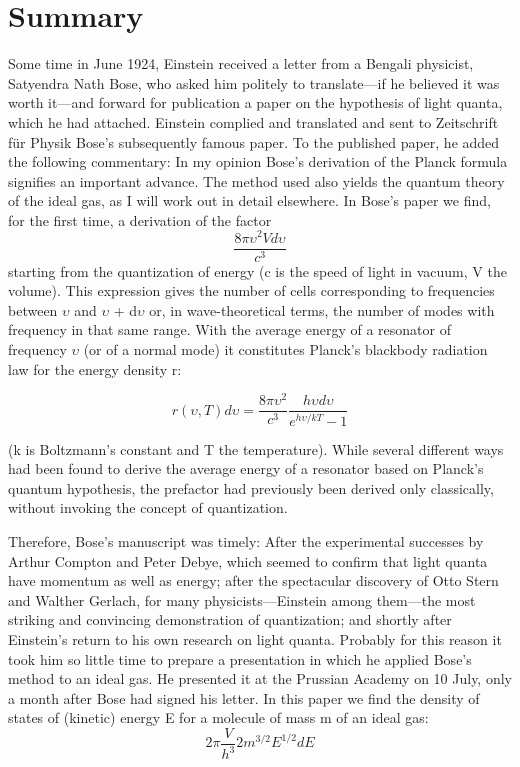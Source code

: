 \documentclass[12pt, letterpaper]{article}
\begin{document}
    \section*{Summary}

    Some time in June 1924, Einstein received a letter from a Bengali physicist,
    Satyendra Nath Bose, who asked him politely to translate—if he believed it
    was worth it—and forward for publication a paper on the hypothesis of light
    quanta, which he had attached. Einstein complied and translated and sent
    to Zeitschrift für Physik Bose’s subsequently famous paper. To the published
    paper, he added the following commentary:
    In my opinion Bose’s derivation of the Planck formula signifies an
    important advance. The method used also yields the quantum theory of the ideal gas, as I will work out in detail elsewhere.
    In Bose’s paper we find, for the first time, a derivation of the factor
    \begin{equation}
        \frac{8 \pi \upsilon ^{2}V d\upsilon }{c^{3}} 
    \end{equation}
    starting from the quantization of energy (c is the speed of light in vacuum,
    V the volume). This expression gives the number of cells corresponding to
    frequencies between $\upsilon$  and $\upsilon$ + d$\upsilon$ or, in wave-theoretical terms, 
    the number of modes with frequency in that same range. With the average energy of a
    resonator of frequency $\upsilon$ (or of a normal mode) it constitutes Planck’s blackbody
    radiation law for the energy density r:
    
    \begin{equation}
        r(\upsilon, T)d\upsilon  = \frac{8\pi \upsilon ^{2}}{c^{3}}\frac{h\upsilon d\upsilon}{e^{h\upsilon/kT}-1}
    \end{equation}
    
    (k is Boltzmann’s constant and T the temperature). While several different ways
    had been found to derive the average energy of a resonator based on Planck’s
    quantum hypothesis, the prefactor had previously been derived only classically,
    without invoking the concept of quantization. 

    Therefore, Bose’s manuscript was timely: After the experimental successes
    by Arthur Compton and Peter Debye, which seemed to confirm that light quanta
    have momentum as well as energy; after the spectacular discovery of Otto
    Stern and Walther Gerlach, for many physicists—Einstein among them—the
    most striking and convincing demonstration of quantization; and shortly after
    Einstein’s return to his own research on light quanta. Probably for this reason
    it took him so little time to prepare a presentation in which he applied Bose’s
    method to an ideal gas. He presented it at the Prussian Academy on 10 July,
    only a month after Bose had signed his letter.
    In this paper we find the density of states of (kinetic) energy E for a molecule
    of mass m of an ideal gas:
    \begin{equation}
        2\pi \frac{V}{h^{3}}2m^{3/2}E^{1/2}dE 
    \end{equation}
    
\end{document}
